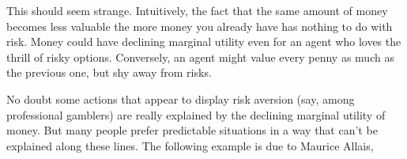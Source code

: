 This should seem strange. Intuitively, the fact that the same amount of money
becomes less valuable the more money you already have has nothing to do with risk.
Money could have declining marginal utility even for an agent who loves the
thrill of risky options. Conversely, an agent might value every penny as much as
the previous one, but shy away from risks.



No doubt some actions that appear to display risk aversion (say, among
professional gamblers) are really explained by the declining marginal utility of
money. But many people prefer predictable situations in a way
that can't be explained along these lines. The following example is due to
Maurice Allais,

